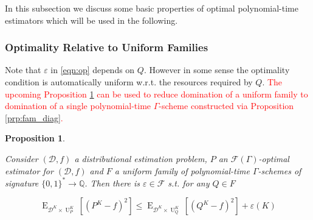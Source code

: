 \documentclass[11pt]{article}
\numberwithin{equation}{section}
\theoremstyle{definition}
\theoremstyle{plain}
\newtheorem{proposition}{Proposition}[section]
\newcommand{\Bool}{\{0,1\}}
\newcommand{\Words}{{\Bool^*}}
\DeclareMathOperator{\E}{E}
\DeclareMathOperator{\Un}{U}
\newcommand{\Rats}{\mathbb{Q}}
\newcommand{\Dist}{\mathcal{D}}
\newcommand{\Fall}{\mathcal{F}}
\newcommand{\EG}{\Fall(\Gamma)}
\begin{document}
In this subsection we discuss some basic properties of optimal polynomial-time estimators which will be used in the following.

\subsubsection{Optimality Relative to Uniform Families}

Note that $\varepsilon$ in \ref{eqn:op} depends on $Q$. However in some sense the optimality condition is automatically uniform w.r.t. the resources required by $Q$. \textcolor{red}{The upcoming Proposition \ref{prp:unif} can be used to reduce domination of a uniform family to domination of a single polynomial-time $\Gamma$-scheme constructed via Proposition \ref{prp:fam_diag}.}

\begin{proposition}
\label{prp:unif}

Consider $(\Dist,f)$ a distributional estimation problem, $P$ an $\EG$-optimal estimator for $(\Dist,f)$ and $F$ a uniform family of polynomial-time $\Gamma$-schemes of signature $\Words \rightarrow \Rats$. Then there is $\varepsilon \in \Fall$ s.t. for any $Q \in F$

\begin{equation}
\E_{\Dist^{K} \times \Un_P^{K}}[(P^{K} - f)^2] \leq \E_{\Dist^{K} \times \Un_Q^{K}}[(Q^{K} - f)^2] + \varepsilon(K)
\end{equation}

\end{proposition}
\end{document}

